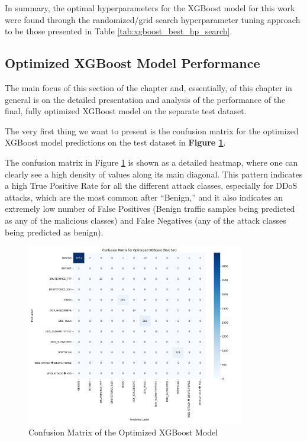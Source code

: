 In summary, the optimal hyperparameters for the XGBoost model for this work were found through the randomized/grid search hyperparameter tuning approach to be those presented in Table \ref{tab:xgboost_best_hp_search}.

\subsection{Optimized XGBoost Model Performance}

The main focus of this section of the chapter and, essentially, of this chapter in general is on the detailed presentation and analysis of the performance of the final, fully optimized XGBoost model on the separate test dataset.

The very first thing we want to present is the confusion matrix for the optimized XGBoost model predictions on the test dataset in \textbf{Figure \ref{fig:confusion_matrix_xgboost}}.

The confusion matrix in Figure \ref{fig:confusion_matrix_xgboost} is shown as a detailed heatmap, where one can clearly see a high density of values along its main diagonal. This pattern indicates a high True Positive Rate for all the different attack classes, especially for DDoS attacks, which are the most common after “Benign,” and it also indicates an extremely low number of False Positives (Benign traffic samples being predicted as any of the malicious classes) and False Negatives (any of the attack classes being predicted as benign).

\begin{figure}[H]
	\centering
	\includegraphics[width=0.85\textwidth]{assets/figures/results/confusion_matrix_xgboost.png}
	\caption{Confusion Matrix of the Optimized XGBoost Model}
	\label{fig:confusion_matrix_xgboost}
\end{figure}


